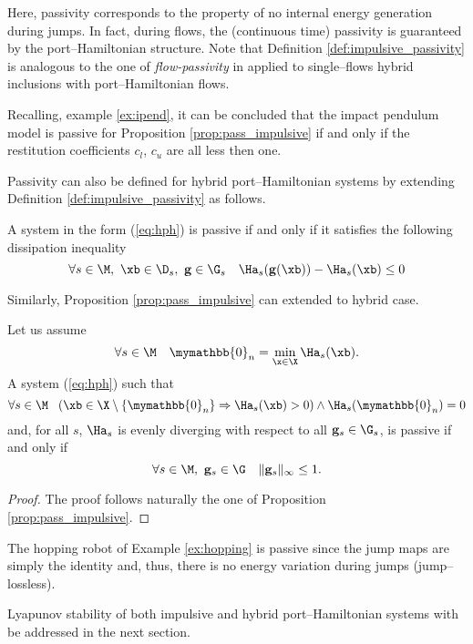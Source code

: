 %
Here, passivity corresponds to the property of no internal energy generation during jumps. In fact, during flows, the (continuous time) passivity is guaranteed by the port--Hamiltonian structure.
Note that Definition \ref{def:impulsive_passivity} is analogous to the one of \textit{flow-passivity} in \cite{naldi2013passivity} applied to single--flows hybrid inclusions with port--Hamiltonian flows. 
%
\begin{rem}
    Recalling, example \ref{ex:ipend}, it can be concluded that the impact pendulum model is passive for Proposition \ref{prop:pass_impulsive} if and only if the restitution coefficients $c_l$, $c_u$ are all less then one.
\end{rem}
%
Passivity can also be defined for hybrid port--Hamiltonian systems by extending Definition \ref{def:impulsive_passivity} as follows.
%
\begin{defn} \label{def:hybrid_passivity}
    A system in the form (\ref{eq:hph}) is passive if and only if it satisfies the following dissipation inequality
    \begin{equation}
        \forall s\in\M,~\xb\in\D_s,~\mathbf{g}\in\G_s \quad \Ha_s(\mathbf{g}(\xb))-\Ha_s(\xb)\leq 0
    \end{equation}
\end{defn}
%
Similarly, Proposition \ref{prop:pass_impulsive} can extended to hybrid case.
%
\begin{prop}\label{prop:pass_hybrid}
	Let us assume
	\begin{equation}
	    \forall s\in\M\quad \mymathbb{0}_n = \min_{\x\in\X}\Ha_s(\xb).
	\end{equation}
	A system (\ref{eq:hph}) such that 
	\begin{equation}
	    \forall s\in\M~~\left(\xb\in\X\setminus\{\mymathbb{0}_n\}\Rightarrow\Ha_s(\xb)>0\right) \land\Ha_s(\mymathbb{0}_n)=0
	\end{equation}
	and, for all $s$, $\Ha_s$ is evenly diverging with respect to all $\mathbf{g}_s\in\G_s$, is passive if and only if 
	\begin{equation}\label{eq:nl_pass}
		\forall s\in\M,~\mathbf{g}_s\in\G\quad\|\mathbf{g}_s\|_\infty\leq 1.
	\end{equation}
\end{prop}
%
\begin{proof}
    The proof follows naturally the one of Proposition \ref{prop:pass_impulsive}.
\end{proof}
%
\begin{rem}
The hopping robot of Example \ref{ex:hopping} is passive since the jump maps are simply the identity and, thus, there is no energy variation during jumps (jump--lossless). 
\end{rem}
%
Lyapunov stability of both impulsive and hybrid port--Hamiltonian systems with be addressed in the next section.
%
\clearpage
